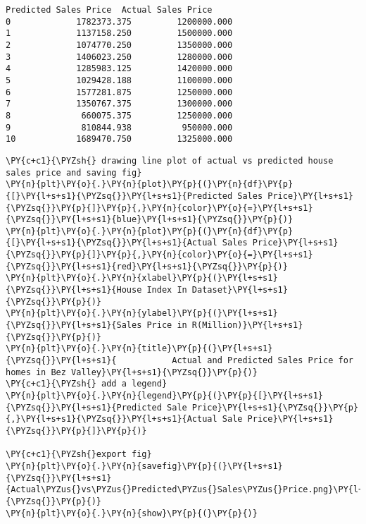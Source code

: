 \begin{tcolorbox}[breakable, size=fbox, boxrule=.5pt, pad at break*=1mm, opacityfill=0]
\begin{Verbatim}[commandchars=\\\{\}]
    Predicted Sales Price  Actual Sales Price
0             1782373.375         1200000.000
1             1137158.250         1500000.000
2             1074770.250         1350000.000
3             1406023.250         1280000.000
4             1285983.125         1420000.000
5             1029428.188         1100000.000
6             1577281.875         1250000.000
7             1350767.375         1300000.000
8              660075.375         1250000.000
9              810844.938          950000.000
10            1689470.750         1325000.000
\end{Verbatim}
\end{tcolorbox}
        
    \begin{tcolorbox}[breakable, size=fbox, boxrule=1pt, pad at break*=1mm,colback=cellbackground, colframe=cellborder]
\begin{Verbatim}[commandchars=\\\{\}]
\PY{c+c1}{\PYZsh{} drawing line plot of actual vs predicted house sales price and saving fig}
\PY{n}{plt}\PY{o}{.}\PY{n}{plot}\PY{p}{(}\PY{n}{df}\PY{p}{[}\PY{l+s+s1}{\PYZsq{}}\PY{l+s+s1}{Predicted Sales Price}\PY{l+s+s1}{\PYZsq{}}\PY{p}{]}\PY{p}{,}\PY{n}{color}\PY{o}{=}\PY{l+s+s1}{\PYZsq{}}\PY{l+s+s1}{blue}\PY{l+s+s1}{\PYZsq{}}\PY{p}{)}
\PY{n}{plt}\PY{o}{.}\PY{n}{plot}\PY{p}{(}\PY{n}{df}\PY{p}{[}\PY{l+s+s1}{\PYZsq{}}\PY{l+s+s1}{Actual Sales Price}\PY{l+s+s1}{\PYZsq{}}\PY{p}{]}\PY{p}{,}\PY{n}{color}\PY{o}{=}\PY{l+s+s1}{\PYZsq{}}\PY{l+s+s1}{red}\PY{l+s+s1}{\PYZsq{}}\PY{p}{)}
\PY{n}{plt}\PY{o}{.}\PY{n}{xlabel}\PY{p}{(}\PY{l+s+s1}{\PYZsq{}}\PY{l+s+s1}{House Index In Dataset}\PY{l+s+s1}{\PYZsq{}}\PY{p}{)}
\PY{n}{plt}\PY{o}{.}\PY{n}{ylabel}\PY{p}{(}\PY{l+s+s1}{\PYZsq{}}\PY{l+s+s1}{Sales Price in R(Million)}\PY{l+s+s1}{\PYZsq{}}\PY{p}{)}
\PY{n}{plt}\PY{o}{.}\PY{n}{title}\PY{p}{(}\PY{l+s+s1}{\PYZsq{}}\PY{l+s+s1}{           Actual and Predicted Sales Price for homes in Bez Valley}\PY{l+s+s1}{\PYZsq{}}\PY{p}{)}
\PY{c+c1}{\PYZsh{} add a legend}
\PY{n}{plt}\PY{o}{.}\PY{n}{legend}\PY{p}{(}\PY{p}{[}\PY{l+s+s1}{\PYZsq{}}\PY{l+s+s1}{Predicted Sale Price}\PY{l+s+s1}{\PYZsq{}}\PY{p}{,}\PY{l+s+s1}{\PYZsq{}}\PY{l+s+s1}{Actual Sale Price}\PY{l+s+s1}{\PYZsq{}}\PY{p}{]}\PY{p}{)}

\PY{c+c1}{\PYZsh{}export fig}
\PY{n}{plt}\PY{o}{.}\PY{n}{savefig}\PY{p}{(}\PY{l+s+s1}{\PYZsq{}}\PY{l+s+s1}{Actual\PYZus{}vs\PYZus{}Predicted\PYZus{}Sales\PYZus{}Price.png}\PY{l+s+s1}{\PYZsq{}}\PY{p}{)}
\PY{n}{plt}\PY{o}{.}\PY{n}{show}\PY{p}{(}\PY{p}{)}
\end{Verbatim}
\end{tcolorbox}

